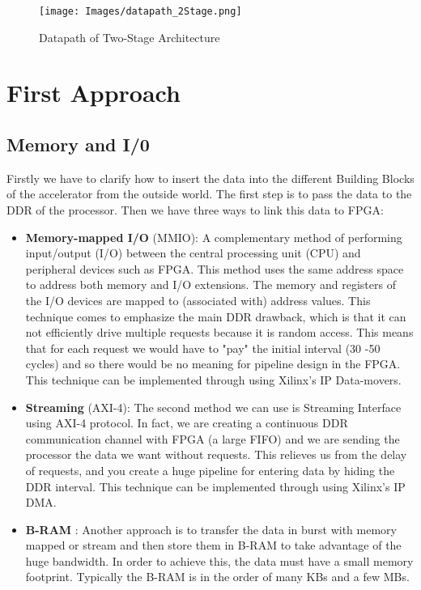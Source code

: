 \begin{figure}[h]
\centering
\texttt{[image: Images/datapath\_2Stage.png]} 
\decoRule
\caption[Datapath of Two-Stage Architecture]{Datapath of Two-Stage Architecture
}
\label{fig:21}
\end{figure}

\section{First Approach}

\subsection{Memory and I/0}
Firstly we have to clarify how to insert the data into the different Building Blocks of the accelerator from the outside world. The first step is to pass the data to the DDR of the processor. Then we have three ways to link this data to FPGA:
\begin{itemize}

    \item \textbf{Memory-mapped I/O }(MMIO): A complementary method of performing input/output (I/O) between the central processing unit (CPU) and peripheral devices such as FPGA. This method uses the same address space to address both memory and I/O extensions. The memory and registers of the I/O devices are mapped to (associated with) address values. This technique comes to emphasize the main DDR drawback, which is that it can not efficiently drive multiple requests because it is random access. This means that for each request we would have to "pay" the initial interval (30 -50 cycles) and so there would be no meaning for pipeline design in the FPGA. This technique can be implemented through using Xilinx's IP Data-movers.
    
    \item \textbf{Streaming }(AXI-4): The second method we can use is Streaming Interface using AXI-4 protocol. In fact, we are creating a continuous DDR communication channel with FPGA (a large FIFO) and we are sending the processor the data we want without requests. This relieves us from the delay of requests, and you create a huge pipeline for entering data by hiding the DDR interval. This technique can be implemented through using Xilinx's IP DMA. 
    
    \item \textbf{B-RAM }: Another approach is to transfer the data in burst with memory mapped or stream and then store them in B-RAM to take advantage of the huge bandwidth. In order to achieve this, the data must have a small memory footprint. Typically the B-RAM is in the order of many KBs and a few MBs. \newline \newline
    
    
\end{itemize}


